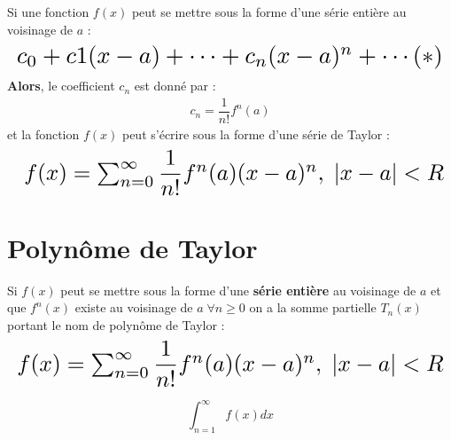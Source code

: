 \documentclass{report}
\begin{document}
\begin{multicols*}{3}
    \begin{theorem}{}{}
        Si une fonction \( f(x) \) peut se mettre sous la forme d'une série entière 
        au voisinage de \( a \) :
        \begin{align*}
        \resizebox{\linewidth}{!}{$
            c_0 + c1(x - a) +  \cdots + c_n (x - a)^n + \cdots (*)
        $}
        \end{align*}
        \textbf{Alors}, le coefficient \( c_n \) est donné par : 
        \begin{align*}
            c_n = \dfrac{1}{n!}f^{n}(a) 
        \end{align*}
        et la fonction \( f(x) \) peut s'écrire sous la forme d'une 
        série de Taylor : 
        \begin{align*}
            \resizebox{\linewidth}{!}{ $
            f(x) = \sum_{n= 0}^{\infty }\dfrac{1}{n!}f^{n}(a)(x - a)^n, \; |x - a| < R 
        $}
        \end{align*}
    \end{theorem}                               

    \section{Polynôme de Taylor}
    Si \( f(x) \) peut se mettre sous la forme d'une \textbf{série entière} au voisinage de 
    \( a \) et que \( f^{n}(x) \) existe au voisinage de \( a  \; \forall n \geq 0\) on 
    a la somme partielle \( T_n(x) \) portant le nom de polynôme de Taylor : 
    \begin{align*}
        \resizebox{\linewidth}{!}{$
            f(x) = \sum_{n=0}^{\infty }\dfrac{1}{n!}f^{n}(a)(x - a)^n, \; |x - a| < R
        $}
    \end{align*}            

    $$\int_{n=1}^{\infty }f(x)dx$$




        






\end{multicols*}
\end{document}
